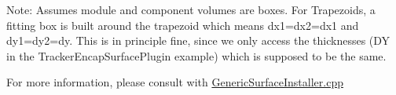 Note: Assumes module and component volumes are boxes. For Trapezoids, a fitting box is built around the trapezoid which means dx1=dx2=dx1 and dy1=dy2=dy. This is in principle fine, since we only access the thicknesses (DY in the TrackerEncapSurfacePlugin example) which is supposed to be the same.

For more information, please consult with \hyperlink{_generic_surface_installer_8cpp}{GenericSurfaceInstaller.cpp} 